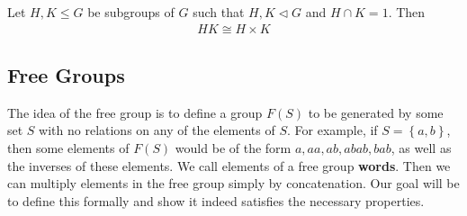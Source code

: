 \documentclass{memoir}
\begin{document}
\begin{thm}
	Let \(H,K\leq G\) be subgroups of \(G\) such that \(H,K \triangleleft G\) and \(H\cap K = 1\). Then
	\begin{align*}
		HK \cong H\times K
	\end{align*}
\end{thm}

\subsection{Free Groups}
\label{sub:free_groups}

The idea of the free group is to define a group \(F(S)\) to be generated by some set \(S\) with no relations on any of the elements of \(S\). For example, if \(S = \left\{ a,b \right\} \), then some elements of \(F(S)\) would be of the form \(a,aa,ab,abab,bab\), as well as the inverses of these elements. We call elements of a free group \textbf{words}. Then we can multiply elements in the free group simply by concatenation. Our goal will be to define this formally and show it indeed satisfies the necessary properties.
\end{document}
